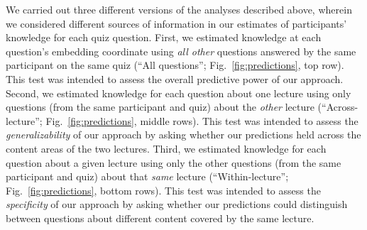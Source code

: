 \documentclass[10pt]{article}
\begin{document}
We carried out three different versions of the analyses described above, wherein we considered different sources of information in our estimates of participants' knowledge for each quiz question. 
First, we estimated knowledge at each question's embedding coordinate using \textit{all other} questions answered by the same participant on the same quiz (``All questions''; Fig.~\ref{fig:predictions}, top row).
This test was intended to assess the overall predictive power of our approach. 
Second, we estimated knowledge for each question about one lecture using only questions (from the same participant and quiz) about the \textit{other} lecture (``Across-lecture''; Fig.~\ref{fig:predictions}, middle rows). 
This test was intended to assess the \textit{generalizability} of our approach by asking whether our predictions held across the content areas of the two lectures.
Third, we estimated knowledge for each question about a given lecture using only the other questions (from the same participant and quiz) about that \textit{same} lecture (``Within-lecture''; Fig.~\ref{fig:predictions}, bottom rows). 
This test was intended to assess the \textit{specificity} of our approach by asking whether our predictions could distinguish between questions about different content covered by the same lecture.

\end{document}
